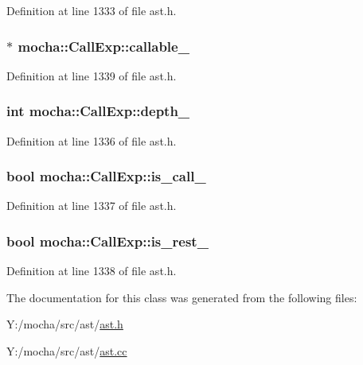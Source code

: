 Definition at line 1333 of file ast.h.

\hypertarget{classmocha_1_1_call_exp_a3e15d3b3c94bdf3f046d45d3b605797a}{
\subsubsection[{callable\_\-}]{$\ast$ {\bf mocha::CallExp::callable\_\-}}}
\label{classmocha_1_1_call_exp_a3e15d3b3c94bdf3f046d45d3b605797a}


Definition at line 1339 of file ast.h.

\hypertarget{classmocha_1_1_call_exp_a1437212b3b447a50e5fbf50512058d79}{
\subsubsection[{depth\_\-}]{\setlength{\rightskip}{0pt plus 5cm}int {\bf mocha::CallExp::depth\_\-}}}
\label{classmocha_1_1_call_exp_a1437212b3b447a50e5fbf50512058d79}


Definition at line 1336 of file ast.h.

\hypertarget{classmocha_1_1_call_exp_a30bdde50d77e5a8da0f8e61897903c0a}{
\subsubsection[{is\_\-call\_\-}]{\setlength{\rightskip}{0pt plus 5cm}bool {\bf mocha::CallExp::is\_\-call\_\-}}}
\label{classmocha_1_1_call_exp_a30bdde50d77e5a8da0f8e61897903c0a}


Definition at line 1337 of file ast.h.

\hypertarget{classmocha_1_1_call_exp_ab345a4e9c56c57a1a5f97b60f17d7c5b}{
\subsubsection[{is\_\-rest\_\-}]{\setlength{\rightskip}{0pt plus 5cm}bool {\bf mocha::CallExp::is\_\-rest\_\-}}}
\label{classmocha_1_1_call_exp_ab345a4e9c56c57a1a5f97b60f17d7c5b}


Definition at line 1338 of file ast.h.



The documentation for this class was generated from the following files:\begin{DoxyCompactItemize}
\item 
Y:/mocha/src/ast/\hyperlink{ast_8h}{ast.h}\item 
Y:/mocha/src/ast/\hyperlink{ast_8cc}{ast.cc}\end{DoxyCompactItemize}
